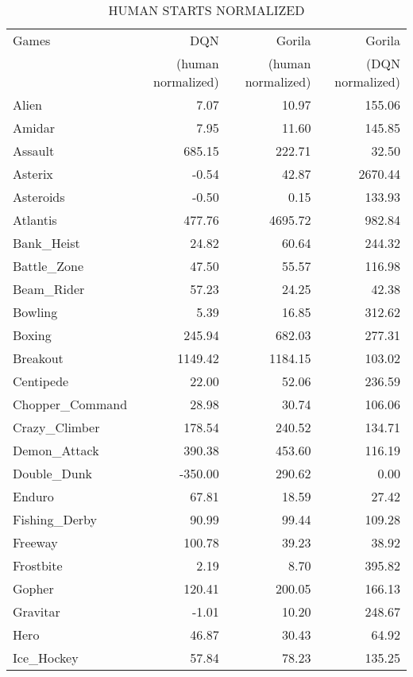 \begin{table*}[h]
	\vskip 0.5in
	\caption{HUMAN STARTS NORMALIZED}
	\centering 
	\begin{tabular}{l|r|r|r}
		\hline \hline
		Games & DQN & Gorila & Gorila \\
		& (human normalized)&(human normalized)& (DQN normalized) \\
		\hline
		Alien & 7.07 & 10.97 & 155.06 \\
		\hline
		Amidar & 7.95 & 11.60 & 145.85 \\
		\hline
		Assault & 685.15 & 222.71 & 32.50 \\
		\hline
		Asterix & -0.54 & 42.87 & 2670.44 \\
		\hline
		Asteroids & -0.50 & 0.15 & 133.93 \\
		\hline
		Atlantis & 477.76 & 4695.72 & 982.84 \\
		\hline
		Bank\_Heist & 24.82 & 60.64 & 244.32 \\
		\hline
		Battle\_Zone & 47.50 & 55.57 & 116.98 \\
		\hline
		Beam\_Rider & 57.23 & 24.25 & 42.38 \\
		\hline
		Bowling & 5.39 & 16.85 & 312.62 \\
		\hline
		Boxing & 245.94 & 682.03 & 277.31 \\
		\hline
		Breakout & 1149.42 & 1184.15 & 103.02 \\
		\hline
		Centipede & 22.00 & 52.06 & 236.59 \\
		\hline
		Chopper\_Command & 28.98 & 30.74 & 106.06 \\
		\hline
		Crazy\_Climber & 178.54 & 240.52 & 134.71 \\
		\hline
		Demon\_Attack & 390.38 & 453.60 & 116.19 \\
		\hline
		Double\_Dunk & -350.00 & 290.62 & 0.00 \\
		\hline
		Enduro & 67.81 & 18.59 & 27.42 \\
		\hline
		Fishing\_Derby & 90.99 & 99.44 & 109.28 \\
		\hline
		Freeway & 100.78 & 39.23 & 38.92 \\
		\hline
		Frostbite & 2.19 & 8.70 & 395.82 \\
		\hline
		Gopher & 120.41 & 200.05 & 166.13 \\
		\hline
		Gravitar & -1.01 & 10.20 & 248.67 \\
		\hline
		Hero & 46.87 & 30.43 & 64.92 \\
		\hline
		Ice\_Hockey & 57.84 & 78.23 & 135.25 \\

\end{tabular}
\end{table*}
